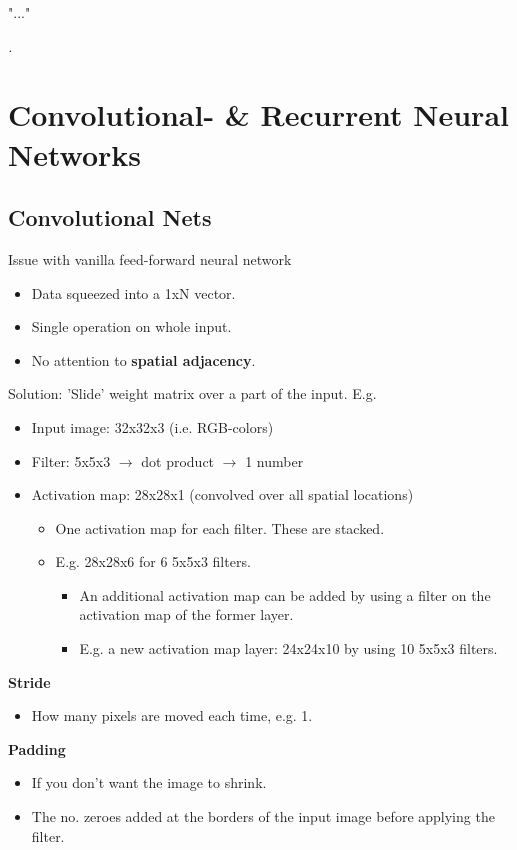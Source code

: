 \epigraph{"..."}
{\textit{.}}

\section{Convolutional- \& Recurrent Neural Networks}
\begin{multicols}{2}
\subsection{Convolutional Nets}
Issue with vanilla feed-forward neural network
\begin{itemize}
  \item Data squeezed into a 1xN vector.
  \item Single operation on whole input.
  \item No attention to \textbf{spatial adjacency}.
\end{itemize}
Solution: 'Slide' weight matrix over a part of the input. E.g.
\begin{itemize}
  \item Input image: 32x32x3 (i.e. RGB-colors)
  \item Filter: 5x5x3 $\rightarrow$ dot product $\rightarrow$ 1 number
  \item Activation map: 28x28x1 (convolved over all spatial locations)
  \begin{itemize}
    \item One activation map for each filter. These are stacked.
    \item E.g. 28x28x6 for 6 5x5x3 filters.
    \begin{itemize}
      \item An additional activation map can be added by using a filter on the activation map of the former layer.
      \item E.g. a new activation map layer: 24x24x10 by using 10 5x5x3 filters.
    \end{itemize}
  \end{itemize}
\end{itemize}
\textbf{Stride}
\begin{itemize}
  \item How many pixels are moved each time, e.g. 1.
\end{itemize}
\textbf{Padding}
\begin{itemize}
  \item If you don't want the image to shrink.
  \item The no. zeroes added at the borders of the input image before applying the filter.

\end{itemize}
\end{multicols}
